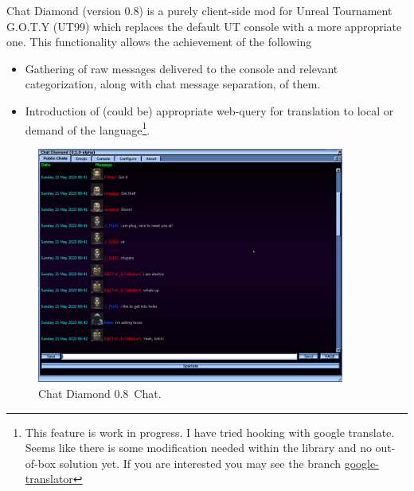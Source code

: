 \documentclass{article}
\theoremstyle{definition}
\newcommand{\ChatDiamondVersion}{0.8}
\begin{document}
Chat Diamond (version \ChatDiamondVersion) is a purely client-side mod for Unreal Tournament G.O.T.Y (UT99) which replaces the default UT console with a more appropriate one.  This functionality allows the achievement of the following
\begin{itemize}
\item Gathering of raw messages delivered to the console and relevant categorization, along with chat message separation, of them.
\item Introduction of (could be) appropriate web-query for translation to local or demand of the language\footnote{This feature is work in progress.  I have tried hooking with google translate. Seems like there is some modification needed within the library and no out-of-box solution yet. If you are interested you may see the branch \href{https://github.com/ravimohan1991/ChatDiamond/tree/google-translator}{google-translator}}.
\end{itemize}

\begin{figure}
\centering
\includegraphics[width=0.9\textwidth]{img}
\caption{Chat Diamond \ChatDiamondVersion~Chat.}
\label{fig:chatdiamond}
\end{figure}
\end{document}
